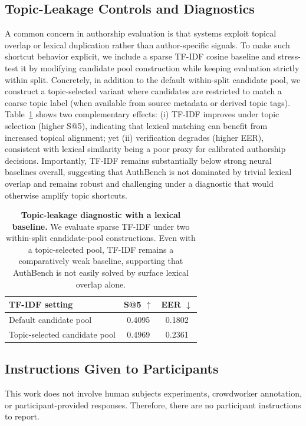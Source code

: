 \documentclass[11pt]{article}
\begin{document}
\subsection{Topic-Leakage Controls and Diagnostics}
\label{subsec:topic-leakage}
A common concern in authorship evaluation is that systems exploit topical overlap or lexical duplication rather than author-specific signals.
To make such shortcut behavior explicit, we include a sparse TF-IDF cosine baseline and stress-test it by modifying candidate pool construction while keeping evaluation strictly within split.
Concretely, in addition to the default within-split candidate pool, we construct a topic-selected variant where candidates are restricted to match a coarse topic label (when available from source metadata or derived topic tags).
Table~\ref{tab:topic-leakage-tfidf} shows two complementary effects: (i) TF-IDF improves under topic selection (higher S@5), indicating that lexical matching can benefit from increased topical alignment; yet (ii) verification degrades (higher EER), consistent with lexical similarity being a poor proxy for calibrated authorship decisions.
Importantly, TF-IDF remains substantially below strong neural baselines overall, suggesting that AuthBench is not dominated by trivial lexical overlap and remains robust and challenging under a diagnostic that would otherwise amplify topic shortcuts.
\begin{table}[h!]
\centering
\small
\setlength{\tabcolsep}{8pt}
\begin{tabular}{lcc}
\toprule
\textbf{TF-IDF setting} & \textbf{S@5 $\uparrow$} & \textbf{EER $\downarrow$} \\
\midrule
Default candidate pool & 0.4095 & 0.1802 \\
Topic-selected candidate pool & 0.4969 & 0.2361 \\
\bottomrule
\end{tabular}
\caption{\textbf{Topic-leakage diagnostic with a lexical baseline.}
We evaluate sparse TF-IDF under two within-split candidate-pool constructions. Even with a topic-selected pool, TF-IDF remains a comparatively weak baseline, supporting that AuthBench is not easily solved by surface lexical overlap alone.}
\label{tab:topic-leakage-tfidf}
\end{table}

\subsection{Instructions Given to Participants}
\label{sec:checklist-d1}
This work does not involve human subjects experiments, crowdworker annotation, or participant-provided responses.
Therefore, there are no participant instructions to report.
\end{document}
